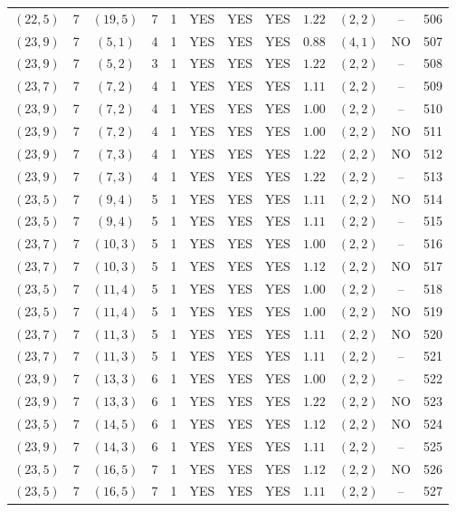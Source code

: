 \begin{longtable}{|c|c|c|c|c|c|c|c|c|c|c|c|}
$(22,5)$ & 7 & $(19,5)$ & 7 & 1 & YES & YES & YES & $1.22$ & $(2,2)$ & -- & 506\\
$(23,9)$ & 7 & $(5,1)$ & 4 & 1 & YES & YES & YES & $0.88$ & $(4,1)$ & NO & 507\\
$(23,9)$ & 7 & $(5,2)$ & 3 & 1 & YES & YES & YES & $1.22$ & $(2,2)$ & -- & 508\\
$(23,7)$ & 7 & $(7,2)$ & 4 & 1 & YES & YES & YES & $1.11$ & $(2,2)$ & -- & 509\\
$(23,9)$ & 7 & $(7,2)$ & 4 & 1 & YES & YES & YES & $1.00$ & $(2,2)$ & -- & 510\\
$(23,9)$ & 7 & $(7,2)$ & 4 & 1 & YES & YES & YES & $1.00$ & $(2,2)$ & NO & 511\\
$(23,9)$ & 7 & $(7,3)$ & 4 & 1 & YES & YES & YES & $1.22$ & $(2,2)$ & NO & 512\\
$(23,9)$ & 7 & $(7,3)$ & 4 & 1 & YES & YES & YES & $1.22$ & $(2,2)$ & -- & 513\\
$(23,5)$ & 7 & $(9,4)$ & 5 & 1 & YES & YES & YES & $1.11$ & $(2,2)$ & NO & 514\\
$(23,5)$ & 7 & $(9,4)$ & 5 & 1 & YES & YES & YES & $1.11$ & $(2,2)$ & -- & 515\\
$(23,7)$ & 7 & $(10,3)$ & 5 & 1 & YES & YES & YES & $1.00$ & $(2,2)$ & -- & 516\\
$(23,7)$ & 7 & $(10,3)$ & 5 & 1 & YES & YES & YES & $1.12$ & $(2,2)$ & NO & 517\\
$(23,5)$ & 7 & $(11,4)$ & 5 & 1 & YES & YES & YES & $1.00$ & $(2,2)$ & -- & 518\\
$(23,5)$ & 7 & $(11,4)$ & 5 & 1 & YES & YES & YES & $1.00$ & $(2,2)$ & NO & 519\\
$(23,7)$ & 7 & $(11,3)$ & 5 & 1 & YES & YES & YES & $1.11$ & $(2,2)$ & NO & 520\\
$(23,7)$ & 7 & $(11,3)$ & 5 & 1 & YES & YES & YES & $1.11$ & $(2,2)$ & -- & 521\\
$(23,9)$ & 7 & $(13,3)$ & 6 & 1 & YES & YES & YES & $1.00$ & $(2,2)$ & -- & 522\\
$(23,9)$ & 7 & $(13,3)$ & 6 & 1 & YES & YES & YES & $1.22$ & $(2,2)$ & NO & 523\\
$(23,5)$ & 7 & $(14,5)$ & 6 & 1 & YES & YES & YES & $1.12$ & $(2,2)$ & NO & 524\\
$(23,9)$ & 7 & $(14,3)$ & 6 & 1 & YES & YES & YES & $1.11$ & $(2,2)$ & -- & 525\\
$(23,5)$ & 7 & $(16,5)$ & 7 & 1 & YES & YES & YES & $1.12$ & $(2,2)$ & NO & 526\\
$(23,5)$ & 7 & $(16,5)$ & 7 & 1 & YES & YES & YES & $1.11$ & $(2,2)$ & -- & 527\\

\end{longtable}
